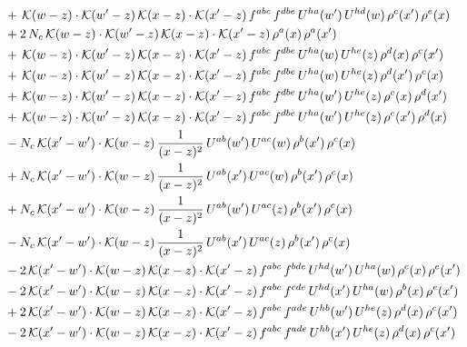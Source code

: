 \documentclass[9pt]{article}
\numberwithin{equation}{section}
\begin{document}
\begin{align}
&+\,\mathcal{K}(w-z)\cdot\mathcal{K}(w'-z)\,\mathcal{K}(x-z)\cdot\mathcal{K}(x'-z)\,f^{abc}\,f^{dbe}\,U^{ha}(w')\,U^{hd}(w)\,\rho^{c}(x')\,\rho^{e}(x)\notag\\
&+2\,N_{c}\,\mathcal{K}(w-z)\cdot\mathcal{K}(w'-z)\,\mathcal{K}(x-z)\cdot\mathcal{K}(x'-z)\,\rho^{a}(x)\,\rho^{a}(x')\notag\\
&+\,\mathcal{K}(w-z)\cdot\mathcal{K}(w'-z)\,\mathcal{K}(x-z)\cdot\mathcal{K}(x'-z)\,f^{abc}\,f^{dbe}\,U^{ha}(w)\,U^{he}(z)\,\rho^{d}(x)\,\rho^{c}(x')\notag\\
&+\,\mathcal{K}(w-z)\cdot\mathcal{K}(w'-z)\,\mathcal{K}(x-z)\cdot\mathcal{K}(x'-z)\,f^{abc}\,f^{dbe}\,U^{ha}(w)\,U^{he}(z)\,\rho^{d}(x')\,\rho^{c}(x)\notag\\
&+\,\mathcal{K}(w-z)\cdot\mathcal{K}(w'-z)\,\mathcal{K}(x-z)\cdot\mathcal{K}(x'-z)\,f^{abc}\,f^{dbe}\,U^{ha}(w')\,U^{he}(z)\,\rho^{c}(x)\,\rho^{d}(x')\notag\\
&+\,\mathcal{K}(w-z)\cdot\mathcal{K}(w'-z)\,\mathcal{K}(x-z)\cdot\mathcal{K}(x'-z)\,f^{abc}\,f^{dbe}\,U^{ha}(w')\,U^{he}(z)\,\rho^{c}(x')\,\rho^{d}(x)\notag\\
&-N_{c}\,\mathcal{K}(x'-w')\cdot\mathcal{K}(w-z)\,\frac{1}{(x-z)^{2}}\,U^{ab}(w')\,U^{ac}(w)\,\rho^{b}(x')\,\rho^{c}(x)\notag\\
&+N_{c}\,\mathcal{K}(x'-w')\cdot\mathcal{K}(w-z)\,\frac{1}{(x-z)^{2}}\,U^{ab}(x')\,U^{ac}(w)\,\rho^{b}(x')\,\rho^{c}(x)\notag\\
&+N_{c}\,\mathcal{K}(x'-w')\cdot\mathcal{K}(w-z)\,\frac{1}{(x-z)^{2}}\,U^{ab}(w')\,U^{ac}(z)\,\rho^{b}(x')\,\rho^{c}(x)\notag\\
&-N_{c}\,\mathcal{K}(x'-w')\cdot\mathcal{K}(w-z)\,\frac{1}{(x-z)^{2}}\,U^{ab}(x')\,U^{ac}(z)\,\rho^{b}(x')\,\rho^{c}(x)\notag\\
&-2\,\mathcal{K}(x'-w')\cdot\mathcal{K}(w-z)\,\mathcal{K}(x-z)\cdot\mathcal{K}(x'-z)\,f^{abc}\,f^{bde}\,U^{hd}(w')\,U^{ha}(w)\,\rho^{c}(x)\,\rho^{e}(x')\notag\\
&-2\,\mathcal{K}(x'-w')\cdot\mathcal{K}(w-z)\,\mathcal{K}(x-z)\cdot\mathcal{K}(x'-z)\,f^{abc}\,f^{cde}\,U^{hd}(x')\,U^{ha}(w)\,\rho^{b}(x)\,\rho^{e}(x')\notag\\
&+2\,\mathcal{K}(x'-w')\cdot\mathcal{K}(w-z)\,\mathcal{K}(x-z)\cdot\mathcal{K}(x'-z)\,f^{abc}\,f^{ade}\,U^{hb}(w')\,U^{he}(z)\,\rho^{d}(x)\,\rho^{c}(x')\notag\\
&-2\,\mathcal{K}(x'-w')\cdot\mathcal{K}(w-z)\,\mathcal{K}(x-z)\cdot\mathcal{K}(x'-z)\,f^{abc}\,f^{ade}\,U^{hb}(x')\,U^{he}(z)\,\rho^{d}(x)\,\rho^{c}(x')\notag\\

\end{align}
\end{document}
